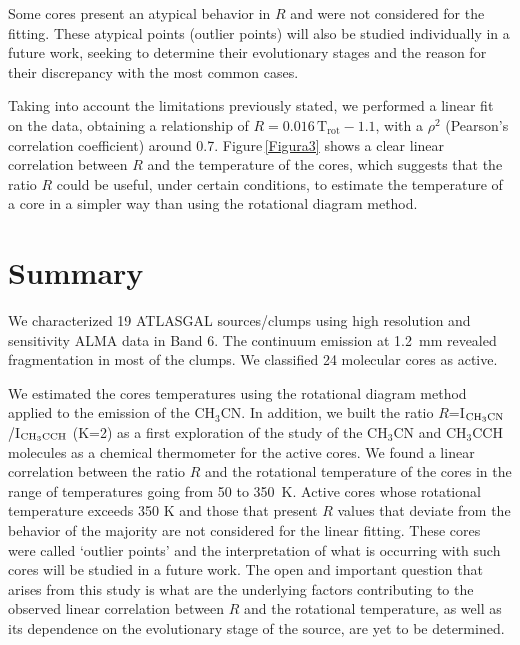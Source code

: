 \documentclass[baaa]{baaa}
\begin{document}
Some cores present an atypical behavior in $R$ and were not considered for the fitting. These atypical points (outlier points) will also be studied individually in a future work, seeking to determine their evolutionary stages and the reason for their discrepancy with the most common cases.

Taking into account the limitations previously stated, we performed a linear fit on the data, obtaining a relationship of $R=0.016\, \mathrm{T_{rot}}-1.1$, with a $\rho^2$ (Pearson's correlation coefficient) around 0.7. Figure\,\ref{Figura3} shows a clear linear correlation between $R$ and the temperature of the cores, which suggests that the ratio $R$ could be useful,  under certain conditions, to estimate the temperature of a core in a simpler way than using the rotational diagram method.



\section{Summary}



We characterized 19 ATLASGAL sources/clumps using high resolution and sensitivity ALMA data in Band 6. The continuum emission at 1.2~mm revealed fragmentation in most of the clumps. We classified 24 molecular cores as active.

We estimated the cores temperatures using the rotational diagram method applied to the emission of the CH$_3$CN. In addition, we built the ratio $R$=I$_{\rm CH_3CN}$/I$_{\rm CH_3CCH}$ (K=2) as a first exploration of the study of the CH$_3$CN  and CH$_3$CCH molecules as a chemical thermometer for the active cores. We found a linear correlation between the ratio $R$ and the rotational temperature of the cores in the range of temperatures going from 50 to 350~K. Active cores whose rotational temperature exceeds 350 K and those that present $R$ values that deviate from the behavior of the majority are not considered for the linear fitting. These cores were called `outlier points' and the interpretation of what is occurring with such cores will be studied in a future work. The open and important question that arises from this study is what are the underlying factors contributing to the observed linear correlation between $R$ and the rotational temperature, as well as its dependence on the evolutionary stage of the source, are yet to be determined.
\end{document}
